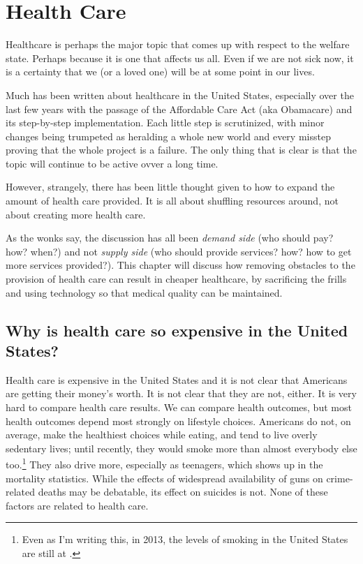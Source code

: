\chapter{Health Care}
\label{chpt:health}

Healthcare is perhaps the major topic that comes up with respect to the welfare
state. Perhaps because it is one that affects us all. Even if we are not sick
now, it is a certainty that we (or a loved one) will be at some point in our
lives.

Much has been written about healthcare in the United States, especially over
the last few years with the passage of the Affordable Care Act (aka Obamacare)
and its step-by-step implementation. Each little step is scrutinized, with
minor changes being trumpeted as heralding a whole new world and every misstep
proving that the whole project is a failure. The only thing that is clear is
that the topic will continue to be active ovver a long time.

However, strangely, there has been little thought given to how to expand the
amount of health care provided. It is all about shuffling resources around, not
about creating more health care.

As the wonks say, the discussion has all been \emph{demand side} (who should
pay? how? when?) and not \emph{supply side} (who should provide services? how?
how to get more services provided?). This chapter will discuss how removing
obstacles to the provision of health care can result in cheaper healthcare, by
sacrificing the frills and using technology so that medical quality can be
maintained.

\section{Why is health care so expensive in the United States?}

Health care is expensive in the United States and it is not clear that
Americans are getting their money's worth. It is not clear that they are not,
either. It is very hard to compare health care results. We can compare health
outcomes, but most health outcomes depend most strongly on lifestyle choices.
Americans do not, on average, make the healthiest choices while eating, and
tend to live overly sedentary lives; until recently, they would smoke more than
almost everybody else too.\footnote{Even as I'm writing this, in 2013, the
levels of smoking in the United States are still at \FIXME.} They also drive
more, especially as teenagers, which shows up in the mortality statistics.
While the effects of widespread availability of guns on crime-related deaths
may be debatable, its effect on suicides is not. None of these factors are
related to health care.

